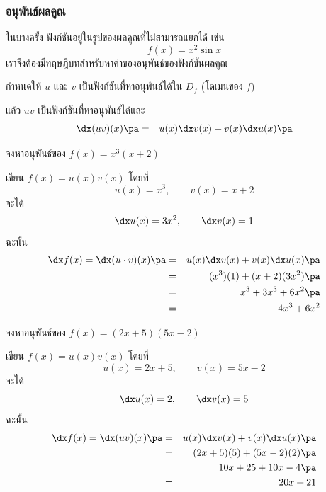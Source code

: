 \begin{frame}
\frametitle{อนุพันธ์ผลคูณ}
ในบางครั้ง ฟังก์ชันอยู่ในรูปของผลคูณที่ไม่สามารถแยกได้ เช่น
\[ f(x) = x^2 \sin x\]
เราจึงต้องมีทฤษฎีบทสำหรับหาค่าของอนุพันธ์ของฟังก์ชันผลคูณ
\begin{thm}{}{}
กำหนดให้ $u$ และ $v$ เป็นฟังก์ชันที่หาอนุพันธ์ได้ใน $D_f$ (โดเมนของ $f$)  \pa

แล้ว $uv$ เป็นฟังก์ชันที่หาอนุพันธ์ได้และ \pa
\begin{eqnarray}
\dx (uv)(x) \pa &=& u(x) \dx v(x) + v(x) \dx u(x) \pa
\end{eqnarray}
\end{thm}
\end{frame}


\begin{frame}[t]
\begin{ex}
จงหาอนุพันธ์ของ $f(x) = x^3(x+2)$
\end{ex}
\begin{sol}
เขียน $f(x) = u(x) v(x)$ โดยที่ 
\[u(x) = x^3, \qquad v(x) = x+2\]
\pa จะได้ 
\[\dx u(x) = 3x^2, \qquad \dx v(x) = 1\] 
\pa ฉะนั้น
\begin{eqnarray*}
\dx f(x) = \dx (u\cdot v)(x) \pa &=& u(x) \dx v(x) + v(x) \dx u(x) \pa \\
&=& (x^3)(1) + (x+2)(3x^2) \pa \\
&=& x^3 + 3x^3 + 6x^2 \pa \\
&=& 4x^3 + 6x^2
\end{eqnarray*}
\end{sol}
\end{frame}


\begin{frame}[t]
\begin{ex}
จงหาอนุพันธ์ของ $f(x) =(2x+5)(5x-2)$
\end{ex} \pa
\begin{sol}
เขียน $f(x) = u(x) v(x)$ โดยที่ 
\[u(x) = 2x+5, \qquad v(x) = 5x-2\] 
\pa จะได้ 
\[\dx u(x) = 2, \qquad \dx v(x) = 5\] 
\pa ฉะนั้น
\begin{eqnarray*}
\dx f(x) = \dx (uv)(x) \pa &=& u(x)\dx v(x) + v(x)\dx u(x) \pa \\
&=& (2x+5)(5) + (5x-2)(2)\pa \\
&=& 10x+25 + 10x-4 \pa \\
&=& 20x+21
\end{eqnarray*}
\end{sol}
\end{frame}


